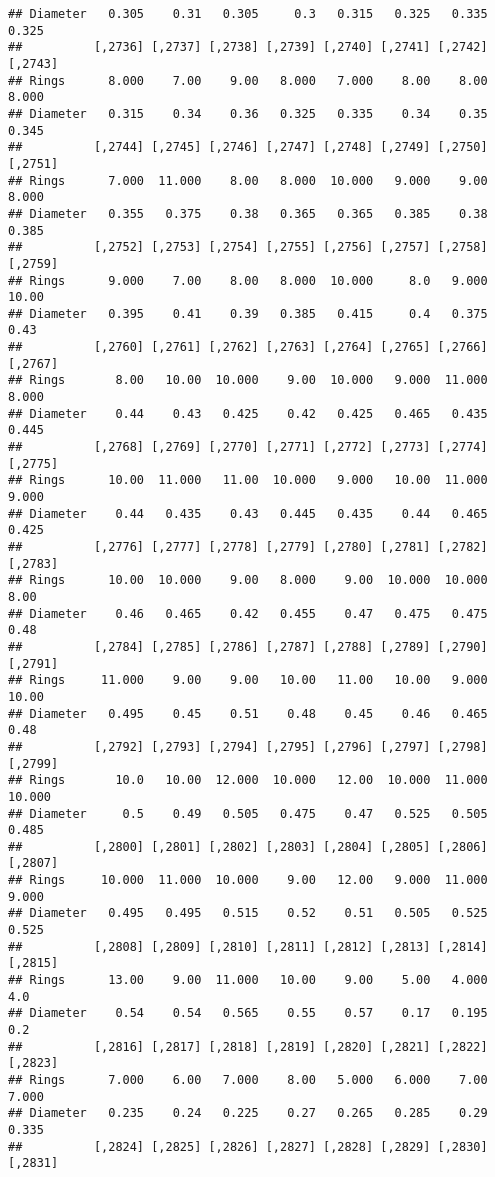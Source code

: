 \documentclass[
]{article}
\begin{document}
\begin{verbatim}
## Diameter   0.305    0.31   0.305     0.3   0.315   0.325   0.335   0.325
##          [,2736] [,2737] [,2738] [,2739] [,2740] [,2741] [,2742] [,2743]
## Rings      8.000    7.00    9.00   8.000   7.000    8.00    8.00   8.000
## Diameter   0.315    0.34    0.36   0.325   0.335    0.34    0.35   0.345
##          [,2744] [,2745] [,2746] [,2747] [,2748] [,2749] [,2750] [,2751]
## Rings      7.000  11.000    8.00   8.000  10.000   9.000    9.00   8.000
## Diameter   0.355   0.375    0.38   0.365   0.365   0.385    0.38   0.385
##          [,2752] [,2753] [,2754] [,2755] [,2756] [,2757] [,2758] [,2759]
## Rings      9.000    7.00    8.00   8.000  10.000     8.0   9.000   10.00
## Diameter   0.395    0.41    0.39   0.385   0.415     0.4   0.375    0.43
##          [,2760] [,2761] [,2762] [,2763] [,2764] [,2765] [,2766] [,2767]
## Rings       8.00   10.00  10.000    9.00  10.000   9.000  11.000   8.000
## Diameter    0.44    0.43   0.425    0.42   0.425   0.465   0.435   0.445
##          [,2768] [,2769] [,2770] [,2771] [,2772] [,2773] [,2774] [,2775]
## Rings      10.00  11.000   11.00  10.000   9.000   10.00  11.000   9.000
## Diameter    0.44   0.435    0.43   0.445   0.435    0.44   0.465   0.425
##          [,2776] [,2777] [,2778] [,2779] [,2780] [,2781] [,2782] [,2783]
## Rings      10.00  10.000    9.00   8.000    9.00  10.000  10.000    8.00
## Diameter    0.46   0.465    0.42   0.455    0.47   0.475   0.475    0.48
##          [,2784] [,2785] [,2786] [,2787] [,2788] [,2789] [,2790] [,2791]
## Rings     11.000    9.00    9.00   10.00   11.00   10.00   9.000   10.00
## Diameter   0.495    0.45    0.51    0.48    0.45    0.46   0.465    0.48
##          [,2792] [,2793] [,2794] [,2795] [,2796] [,2797] [,2798] [,2799]
## Rings       10.0   10.00  12.000  10.000   12.00  10.000  11.000  10.000
## Diameter     0.5    0.49   0.505   0.475    0.47   0.525   0.505   0.485
##          [,2800] [,2801] [,2802] [,2803] [,2804] [,2805] [,2806] [,2807]
## Rings     10.000  11.000  10.000    9.00   12.00   9.000  11.000   9.000
## Diameter   0.495   0.495   0.515    0.52    0.51   0.505   0.525   0.525
##          [,2808] [,2809] [,2810] [,2811] [,2812] [,2813] [,2814] [,2815]
## Rings      13.00    9.00  11.000   10.00    9.00    5.00   4.000     4.0
## Diameter    0.54    0.54   0.565    0.55    0.57    0.17   0.195     0.2
##          [,2816] [,2817] [,2818] [,2819] [,2820] [,2821] [,2822] [,2823]
## Rings      7.000    6.00   7.000    8.00   5.000   6.000    7.00   7.000
## Diameter   0.235    0.24   0.225    0.27   0.265   0.285    0.29   0.335
##          [,2824] [,2825] [,2826] [,2827] [,2828] [,2829] [,2830] [,2831]

\end{verbatim}
\end{document}
